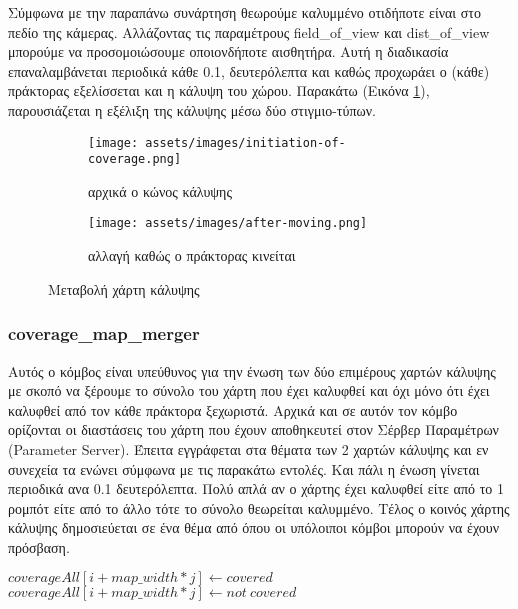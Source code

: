 Σύμφωνα με την παραπάνω συνάρτηση θεωρούμε καλυμμένο οτιδήποτε είναι στο πεδίο της κάμερας. Αλλάζοντας τις παραμέτρους field\_of\_view και dist\_of\_view μπορούμε να προσομοιώσουμε οποιονδήποτε αισθητήρα.
Αυτή η διαδικασία επαναλαμβάνεται περιοδικά κάθε 0.1, δευτερόλεπτα και καθώς προχωράει ο (κάθε) πράκτορας εξελίσσεται και η κάλυψη του χώρου. Παρακάτω (Εικόνα \ref{fig:coverage-map}), παρουσιάζεται η εξέλιξη της κάλυψης μέσω δύο στιγμιο-τύπων.
\\


\begin{figure}[!h]
	\centering
	\begin{subfigure}{0.5\textwidth}
		\texttt{[image: assets/images/initiation-of-coverage.png]}
		\caption{αρχικά ο κώνος κάλυψης}
	\end{subfigure}%
	\begin{subfigure}{0.4\textwidth}
		\texttt{[image: assets/images/after-moving.png]}
		\caption{αλλαγή καθώς ο πράκτορας κινείται}
	\end{subfigure}
	\caption{Μεταβολή χάρτη κάλυψης}
	\label{fig:coverage-map}
\end{figure}

\newpage

\subsubsection{coverage\_map\_merger} Αυτός ο κόμβος είναι υπεύθυνος για την ένωση των δύο επιμέρους χαρτών κάλυψης με σκοπό να ξέρουμε το σύνολο του χάρτη που έχει καλυφθεί και όχι μόνο ότι έχει καλυφθεί από τον κάθε πράκτορα ξεχωριστά. Αρχικά και σε αυτόν τον κόμβο ορίζονται οι διαστάσεις του χάρτη που έχουν αποθηκευτεί στον Σέρβερ Παραμέτρων (Parameter Server). Έπειτα εγγράφεται στα θέματα των 2 χαρτών κάλυψης και εν συνεχεία τα ενώνει σύμφωνα με τις παρακάτω εντολές. Και πάλι η ένωση γίνεται περιοδικά ανα 0.1 δευτερόλεπτα. Πολύ απλά αν ο χάρτης έχει καλυφθεί είτε από το 1 ρομπότ είτε από το άλλο τότε το σύνολο θεωρείται καλυμμένο. Τέλος ο κοινός χάρτης κάλυψης δημοσιεύεται σε ένα θέμα από όπου οι υπόλοιποι κόμβοι μπορούν να έχουν πρόσβαση.

\begin{algorithmic}
	\State $ coverageAll[i + map\_width * j] \gets covered $
	\Else
	\State $ coverageAll[i + map\_width * j] \gets not\ covered $
	\EndIf
	\EndFor
	\EndFor		
\end{algorithmic}

